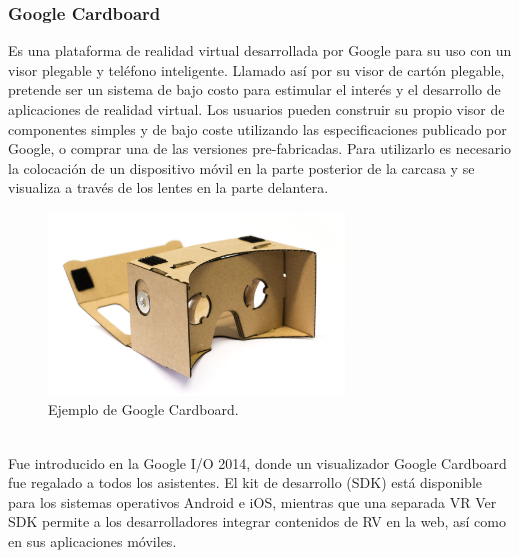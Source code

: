 \documentclass[12pt]{article}
\begin{document}
\subsubsection{Google Cardboard}
Es una plataforma de realidad virtual desarrollada por Google\cite{cardboard} para su uso con un visor plegable y teléfono inteligente. Llamado así por su visor de cartón plegable, pretende ser un sistema de bajo costo para estimular el interés y el desarrollo de aplicaciones de realidad virtual. Los usuarios pueden construir su propio visor de componentes simples y de bajo coste utilizando las especificaciones publicado por Google, o comprar una de las versiones pre-fabricadas. Para utilizarlo es necesario  la colocación de un dispositivo móvil en la parte posterior de la carcasa y se  visualiza a través de los lentes en la parte delantera.
\begin{figure}[h!]
\includegraphics[width=0.7\textwidth,center]{google_cardboard.jpg}
\caption{Ejemplo de Google Cardboard.}
\end{figure}
\\Fue introducido en la Google I/O 2014, donde un visualizador Google Cardboard fue regalado a todos los asistentes. El kit de desarrollo (SDK) está disponible para los sistemas operativos Android e iOS, mientras que una separada VR Ver SDK permite a los desarrolladores integrar contenidos de RV en la web, así como en sus aplicaciones móviles. 
\end{document}
